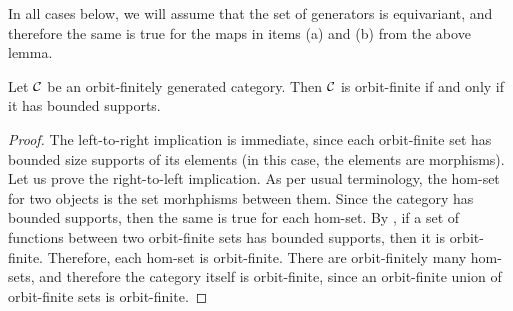 In all cases below, we will assume that the set of generators is equivariant, and therefore the same is true for the maps in items (a) and (b) from the above lemma. 


\begin{lemma}\label{lem:bounded-supports}
    Let ${\mathcal C}$ be an orbit-finitely generated category. Then ${\mathcal C}$ is orbit-finite if and only if it has bounded supports.  
\end{lemma}
\begin{proof}
    The left-to-right implication is immediate, since each orbit-finite set has bounded size supports of its elements (in this case, the elements are morphisms). Let us prove the right-to-left implication. 
    As per usual terminology, the hom-set for two objects is the set morhphisms between them. Since the category has bounded supports, then the same is true for each hom-set. By \cite[Lemma 15]{DBLP:journals/corr/abs-1907-10504}, if a set of functions between two orbit-finite sets has bounded supports, then it is orbit-finite. Therefore, each hom-set is orbit-finite. There are orbit-finitely many hom-sets, and therefore the category itself is orbit-finite, since an orbit-finite union of orbit-finite sets is orbit-finite.
\end{proof}

